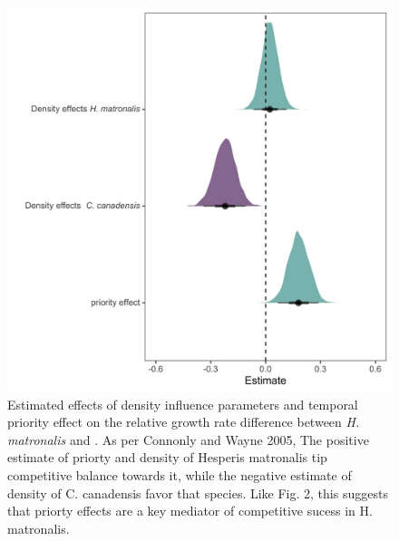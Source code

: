 \documentclass{article}\usepackage[]{graphicx}\usepackage[]{color}
\begin{document}
\begin{figure}[h!]
    \centering
\includegraphics[width=\textwidth]{..//figure/mu_plots.jpeg}
    \caption{Estimated effects of density influence parameters and temporal priority effect on the relative growth rate difference between \textit{H. matronalis} and . As per Connonly and Wayne 2005, The positive estimate of priorty and density of Hesperis matronalis tip competitive balance towards it, while the negative estimate of density of C. canadensis favor that species. Like Fig. 2, this suggests that priorty effects are a key mediator of competitive sucess in H. matronalis.  } 
    \label{fig:Cc}
\end{figure}
\end{document}
